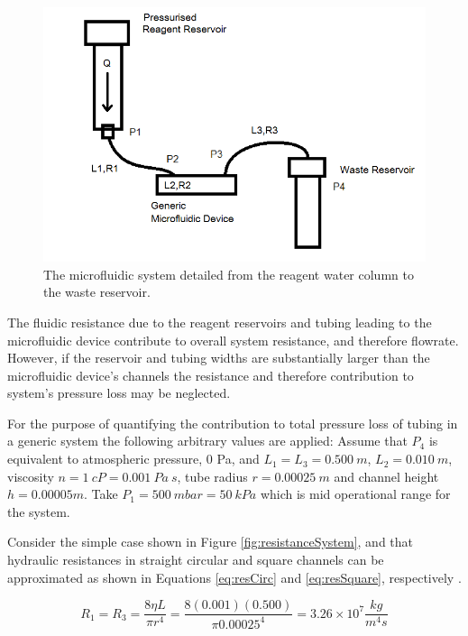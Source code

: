 \begin{figure}[H]
\centering 
\includegraphics[width=01.0\columnwidth]{resistanceSystem.PNG} 
\caption[Hydraulic Resistance of System]{The microfluidic system detailed from the reagent water column to the waste reservoir.} %
\label{fig:resistanceSystem} 
\end{figure}

The fluidic resistance due to the reagent reservoirs and tubing leading to the microfluidic device contribute to overall system resistance, and therefore flowrate. However, if the reservoir and tubing widths are substantially larger than the microfluidic device's channels the resistance and therefore contribution to system's pressure loss may be neglected.

For the purpose of quantifying the contribution to total pressure loss of tubing in a generic system the following arbitrary values are applied: Assume that $P_4$ is equivalent to atmospheric pressure, 0 Pa, and $L_1=L_3= 0.500 \ m$, $L_2=0.010 \ m$, viscosity $n=1 \ cP = 0.001 \ Pa \ s$, tube radius $r=0.00025 \ m$ and channel height $h=0.00005m$. Take $P_1 = 500 \ mbar = 50 \ kPa$ which is mid operational range for the system.

Consider the simple case shown in Figure \vref{fig:resistanceSystem}, and that hydraulic resistances in straight circular and square channels can be approximated as shown in Equations \vref{eq:resCirc} and \vref{eq:resSquare}, respectively \cite{Bruus2008}.

\begin{equation}
R_1 = R_3 = \frac{8 \eta L}{\pi r^4}= \frac{8 (0.001) (0.500)}{\pi 0.00025^4} = 3.26  \times 10^7 \frac{kg}{m^4s}
\label{eq:resCirc}
\end{equation}

